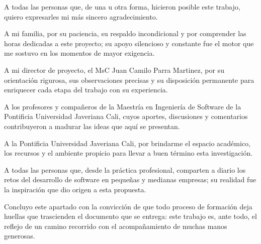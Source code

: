 \agradecimientos  %
{%
A todas las personas que, de una u otra forma, hicieron posible este trabajo, quiero expresarles mi más sincero agradecimiento.

A mi familia, por su paciencia, su respaldo incondicional y por comprender las horas dedicadas a este proyecto; su apoyo silencioso y constante fue el motor que me sostuvo en los momentos de mayor exigencia.

A mi director de proyecto, el MsC Juan Camilo Parra Martinez, por su orientación rigurosa, sus observaciones precisas y su disposición permanente para enriquecer cada etapa del trabajo con su experiencia.

A los profesores y compañeros de la Maestría en Ingeniería de Software de la Pontificia Universidad Javeriana Cali, cuyos aportes, discusiones y comentarios contribuyeron a madurar las ideas que aquí se presentan.

A la Pontificia Universidad Javeriana Cali, por brindarme el espacio académico, los recursos y el ambiente propicio para llevar a buen término esta investigación.

A todas las personas que, desde la práctica profesional, comparten a diario los retos del desarrollo de software en pequeñas y medianas empresas; su realidad fue la inspiración que dio origen a esta propuesta.

Concluyo este apartado con la convicción de que todo proceso de formación deja huellas que trascienden el documento que se entrega: este trabajo es, ante todo, el reflejo de un camino recorrido con el acompañamiento de muchas manos generosas.

} %
